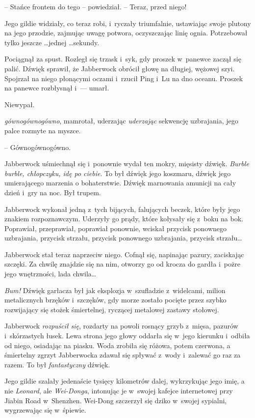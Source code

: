 \documentclass[oneside,polish,11pt,rmheadings]{mwbk}
\begin{document}
-- Stańce frontem do tego -- powiedział. -- Teraz, przed niego!  


Jego gildie widziały, co teraz robi, i~ryczały triumfalnie, ustawiając swoje plutony na jego przodzie, zajmując uwagę potwora, oczyszczając linię ognia. Potrzebował tylko jeszcze \ldots  jednej \ldots  sekundy. 


Pociągnął za spust. Rozległ się trzask i~syk, gdy proszek w~panewce zaczął się palić. Dźwięk sprawił, że Jabberwock obrócił głowę na długiej, wężowej szyi. Spojrzał na niego płonącymi oczami i~rzucił Ping i~Lu na dno oceanu. Proszek na panewce rozbłysnął i~--- umarł. 


Niewypał.  


\textit{gównogównogówno}, mamrotał, uderzając \textit{uderzając} sekwencję uzbrajania, jego palce rozmyte na myszce. 

-- Gównogównogówno. 


Jabberwock uśmiechnął się i~ponownie wydał ten mokry, mięsisty dźwięk. \textit{Burble burble, chłopczyku, idę po ciebie}. To był dźwięk jego koszmaru, dźwięk jego umierającego marzenia o bohaterstwie. Dźwięk marnowania amunicji na cały dzień i~gry na noc. Był trupem. 


Jabberwock wykonał jedną z~tych bijących, falujących beczek, które były jego znakiem rozpoznawczym. Uderzyły go prądy, które kołysały się z~boku na bok. Poprawiał, przeprawiał, poprawiał ponownie, wciskał przycisk ponownego uzbrajania, przycisk strzału, przycisk ponownego uzbrajania, przycisk strzału\ldots  


Jabberwock stał teraz naprzeciw niego. Cofnął się, napinając pazury, zaciskając szczęki. Za chwilę znajdzie się na nim, otworzy go od krocza do gardła i~pożre jego wnętrzności, lada chwila\ldots  


\textit{Bum!} Dźwięk garłacza był jak eksplozja w~szufladzie z~widelcami, milion metalicznych brzęków i~szczęków, gdy morze zostało pocięte przez szybko rozwijający się stożek śmiertelnej, ryczącej metalowej zastawy stołowej. 


Jabberwock \textit{rozpuścił się}, rozdarty na powoli rosnący grzyb z~mięsa, pazurów i~skórzastych łusek. Lewa strona jego głowy oddarła się w~jego kierunku i~odbiła od niego, osiadając na piasku. Woda zrobiła się różowa, potem czerwona, a śmiertelny zgrzyt Jabberwocka zdawał się spływać z~wody i~zalewać go raz za razem. To był \textit{fantastyczny }dźwięk. 


Jego gildie szalały jedenaście tysięcy kilometrów dalej, wykrzykując jego imię, a nie \textit{Leonard}, ale \textit{Wei-Donga}, intonując je w~swojej kafejce internetowej przy Jiabin Road w~Shenzhen. Wei-Dong szczerzył się dziko w~swojej sypialni, wygrzewając się w~śpiewie. 
\end{document}
